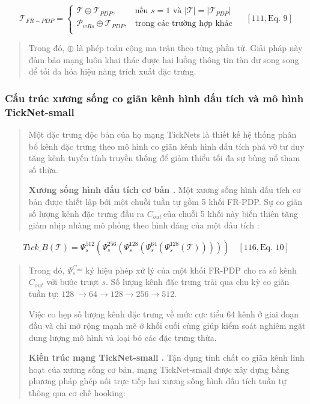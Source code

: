 \documentclass[
]{article}
\begin{document}
\[\mathcal{T}_{FR - PDP} = \left\{ \begin{matrix}
\mathcal{T} \oplus \mathcal{T}_{PDP}, & \text{nếu~}s = 1\text{~và~}\left| \mathcal{T} \right| = \left| \mathcal{T}_{PDP} \right| \\
\mathcal{P}_{wRs} \oplus \mathcal{T}_{PDP}, & \text{trong~các~trường~hợp~khác} \\
\end{matrix} \right.\ \quad\left\lbrack 111,\text{Eq.~9} \right\rbrack\]

\begin{quote}
Trong đó, \(\oplus\) là phép toán cộng ma trận theo từng phần tử. Giải
pháp này đảm bảo mạng luôn khai thác được hai luồng thông tin tàn dư
song song để tối đa hóa hiệu năng trích xuất đặc trưng.
\end{quote}

\hypertarget{cux1ea5u-truxfac-xux1b0ux1a1ng-sux1ed1ng-co-giuxe3n-kuxeanh-huxecnh-dux1ea5u-tuxedch-vuxe0-muxf4-huxecnh-ticknet-small}{%
\subsubsection{Cấu trúc xương sống co giãn kênh hình dấu tích và mô hình
TickNet-small}\label{cux1ea5u-truxfac-xux1b0ux1a1ng-sux1ed1ng-co-giuxe3n-kuxeanh-huxecnh-dux1ea5u-tuxedch-vuxe0-muxf4-huxecnh-ticknet-small}}

\begin{quote}
Một đặc trưng độc bản của họ mạng TickNets là thiết kế hệ thống phân bổ
kênh đặc trưng theo mô hình co giãn kênh hình dấu tích phá vỡ tư duy
tăng kênh tuyến tính truyền thống để giảm thiểu tối đa sự bùng nổ tham
số thừa.

\textbf{Xương sống hình dấu tích cơ bản .} Một xương sống hình dấu tích
cơ bản được thiết lập bởi một chuỗi tuần tự gồm 5 khối FR-PDP. Sự co
giãn số lượng kênh đặc trưng đầu ra \(C_{out\ }\)của chuỗi 5 khối này
biến thiên tăng giảm nhịp nhàng mô phỏng theo hình dáng của một dấu tích
:
\end{quote}

\[Tick\_ B\left( \mathcal{T} \right) = \Psi_{s}^{512}\left( \Psi_{s}^{256}\left( \Psi_{s}^{128}\left( \Psi_{s}^{64}\left( \Psi_{s}^{128}\left( \mathcal{T} \right) \right) \right) \right) \right)\quad\left\lbrack 116,\text{Eq.~10} \right\rbrack\]

\begin{quote}
Trong đó, \(\Psi_{s}^{C_{out}}\ \)ký hiệu phép xử lý của một khối FR-PDP
cho ra số kênh \(C_{out}\) với bước trượt \(s\). Số lượng kênh đặc trưng
trải qua chu kỳ co giãn tuần tự:
\(128\  \rightarrow 64 \rightarrow 128 \rightarrow 256 \rightarrow 512\).

Việc co hẹp số lượng kênh đặc trưng về mức cực tiểu 64 kênh ở giai đoạn
đầu và chỉ mở rộng mạnh mẽ ở khối cuối cùng giúp kiểm soát nghiêm ngặt
dung lượng mô hình và loại bỏ các đặc trưng thừa.

\textbf{Kiến trúc mạng TickNet-small .} Tận dụng tính chất co giãn kênh
linh hoạt của xương sống cơ bản, mạng TickNet-small được xây dựng bằng
phương pháp ghép nối trực tiếp hai xương sống hình dấu tích tuần tự
thông qua cơ chế hooking:
\end{quote}
\end{document}
